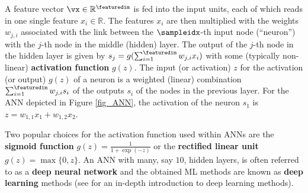 \documentclass[12pt]{report}
\begin{document}
A feature vector $\vx \in \mathbb{R}^{\featuredim}$ is fed into the input units, 
each of which reads in one single feature $x_{i} \in \mathbb{R}$. The features 
$x_{i}$ are then multiplied with the weights $w_{j,i}$ associated with the link 
between the $\sampleidx$-th input node (``neuron'') with the $j$-th node 
in the middle (hidden) layer. The output of the $j$-th node in the hidden layer 
is given by $s_{j} = g( \sum_{i=1}^{\featuredim} w_{j,i} x_{i} )$ with some 
(typically non-linear) {\bf activation function} $g(z)$. The input (or activation) 
$z$ for the activation (or output) $g(z)$ of a neuron is a weighted 
(linear) combination $ \sum_{i=1}^{\featuredim} w_{j,i} s_{i}$ of the outputs $s_{i}$ 
of the nodes in the previous layer. For the ANN depicted in Figure \ref{fig_ANN}, 
the activation of the neuron $s_{1}$ is $z=w_{1,1}x_{1} + w_{1,2}x_{2}$.

Two popular choices for the activation function used within ANNs 
are the {\bf sigmoid function} $g(z) = \frac{1}{1+\exp(-z)}$ or the 
{\bf rectified linear unit} $g(z) = \max\{0,z\}$. An ANN with many, 
say $10$, hidden layers, is often referred to as a {\bf deep neural network} 
and the obtained ML methods are known as {\bf deep learning} methods (see \cite{Goodfellow-et-al-2016} for an in-depth 
introduction to deep learning methods). 
\end{document}
